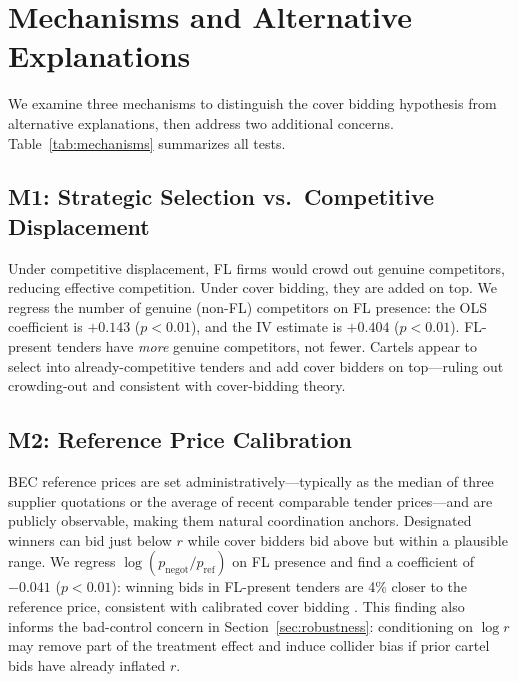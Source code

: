 \section{Mechanisms and Alternative Explanations} %
\label{sec:mechanisms}

We examine three mechanisms to distinguish the cover bidding hypothesis
from alternative explanations, then address two additional concerns.
Table~\ref{tab:mechanisms} summarizes all tests.



\subsection{M1: Strategic Selection vs.\ Competitive Displacement}

Under competitive displacement, FL firms would crowd out genuine
competitors, reducing effective competition. Under cover bidding, they
are added on top. We regress the number of genuine (non-FL) competitors
on FL presence: the OLS coefficient is $+0.143$ ($p < 0.01$), and the
IV estimate is $+0.404$ ($p < 0.01$). FL-present tenders have
\emph{more} genuine competitors, not fewer. Cartels appear to select
into already-competitive tenders and add cover bidders on top---ruling
out crowding-out and consistent with cover-bidding theory.

\subsection{M2: Reference Price Calibration}

BEC reference prices are set administratively---typically as the median %
of three supplier quotations or the average of recent comparable tender
prices---and are publicly observable, making them natural coordination
anchors. Designated winners can bid just below $r$ while cover bidders
bid above but within a plausible range. We regress
$\log(p_{\text{negot}} / p_{\text{ref}})$ on FL presence and find a
coefficient of $-0.041$ ($p < 0.01$): winning bids in FL-present
tenders are 4\% closer to the reference price, consistent with
calibrated cover bidding \citep{marshall2012economics}. This finding
also informs the bad-control concern in Section~\ref{sec:robustness}:
conditioning on $\log r$ may remove part of the treatment effect and
induce collider bias if prior cartel bids have already inflated $r$.

